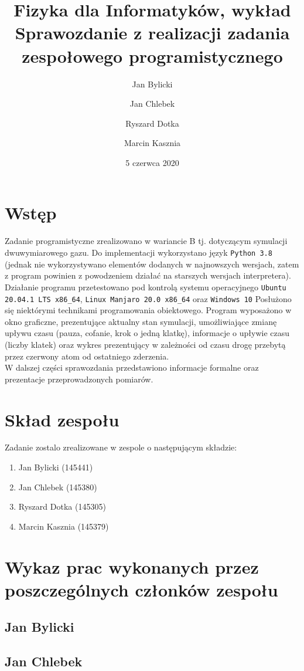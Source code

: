 \documentclass{article}
\title{Fizyka dla Informatyków, wykład\\ Sprawozdanie z realizacji zadania zespołowego programistycznego}
\author{Jan Bylicki \and Jan Chlebek \and Ryszard Dotka \and Marcin Kasznia}
\date{5 czerwca 2020}
\begin{document}
\maketitle

\section{Wstęp}
Zadanie programistyczne zrealizowano w wariancie B tj. dotyczącym symulacji dwuwymiarowego gazu. Do implementacji wykorzystano język \verb+Python 3.8+ (jednak nie wykorzystywano elementów dodanych w najnowszych wersjach, zatem z program powinien z powodzeniem działać na starszych wersjach interpretera). Działanie programu przetestowano pod kontrolą systemu operacyjnego \verb+Ubuntu 20.04.1 LTS x86_64+, \verb+Linux Manjaro 20.0 x86_64+ oraz \verb+Windows 10+ Posłużono się niektórymi technikami programowania obiektowego. Program wyposażono w okno graficzne, prezentujące aktualny stan symulacji, umożliwiające zmianę upływu czasu (pauza, cofanie, krok o jedną klatkę), informacje o upływie czasu (liczby klatek) oraz wykres prezentujący w zależności od czasu drogę przebytą przez czerwony atom od ostatniego zderzenia.\\
W dalszej części sprawozdania przedstawiono informacje formalne oraz prezentacje przeprowadzonych pomiarów.

\section{Skład zespołu}
Zadanie zostalo zrealizowane w zespole o następującym składzie:
\begin{enumerate}
    \item Jan Bylicki (145441)
    \item Jan Chlebek (145380)
    \item Ryszard Dotka (145305)
    \item Marcin Kasznia (145379)
\end{enumerate}

\section{Wykaz prac wykonanych przez poszczególnych członków zespołu}
    \subsection{Jan Bylicki}
    \subsection{Jan Chlebek}
\end{document}
